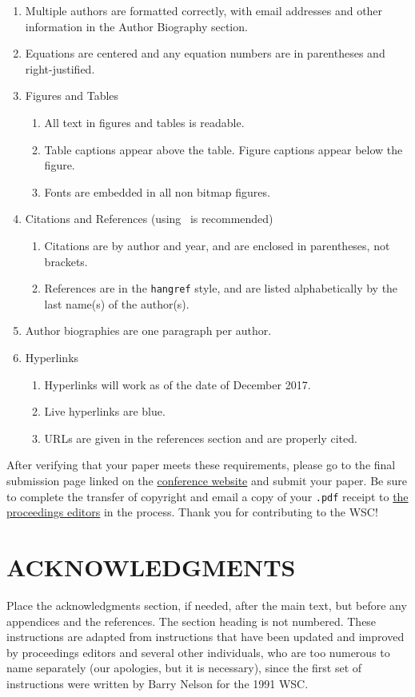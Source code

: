 \documentclass{wscpaperproc}
\theoremstyle{wsc}
\begin{document}
\begin{enumerate}
	\item Multiple authors are formatted correctly, with email addresses and other information in the Author Biography section.
	\item Equations are centered and any equation numbers are in parentheses and right-justified.
	\item Figures and Tables
	\begin{enumerate}
		\item All text in figures and tables is readable.
		\item Table captions appear above the table. Figure captions appear below the figure.
		\item Fonts are embedded in all non bitmap figures.
	\end{enumerate}
	\item Citations and References (using \BibTeX\ is recommended)
	\begin{enumerate}
		\item Citations are by author and year, and are enclosed in parentheses, not brackets.
		\item References are in the {\tt hangref} style, and are listed alphabetically by the last name(s) of the author(s).
	\end{enumerate}
	\item Author biographies are one paragraph per author.
	\item Hyperlinks
	\begin{enumerate}
		\item Hyperlinks will work as of the date of December 2017.
		\item Live hyperlinks are blue.
		\item URLs are given in the references section and are properly cited.
	\end{enumerate}

\end{enumerate}

After verifying that your paper meets these requirements, please go to the final submission page linked on the \href{http://www.wintersim.org}{conference website} \cite{WSC} and submit your paper.
Be sure to complete the transfer of copyright and email a copy of your {\tt .pdf} receipt to \href{mailto://wsc17proceedings@gmail.com}{the proceedings editors} in the process.
Thank you for contributing to the WSC!

\section*{ACKNOWLEDGMENTS}
Place the acknowledgments section, if needed, after the main text, but before any appendices and the references. The section heading is not numbered.
These instructions are adapted from instructions that have been updated and improved by proceedings editors and several other individuals, who are too numerous to name separately (our apologies, but it is necessary), since the first set of instructions were written by Barry Nelson for the 1991 WSC.
\end{document}
